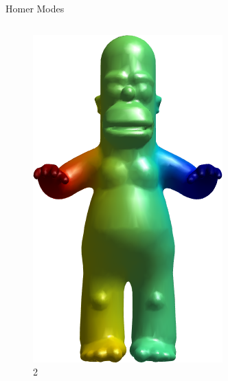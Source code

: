 \documentclass{beamer}
\begin{document}
\begin{frame}{Homer Modes}
\begin{columns}
\begin{column}[T]{3cm}
\begin{figure}[t]
    \includegraphics[width=\textwidth]{Harmonics/HomerModes/2.png}
    \caption*{\huge 2}
\end{figure}
\end{column}
\end{columns}

\end{frame}
\end{document}
